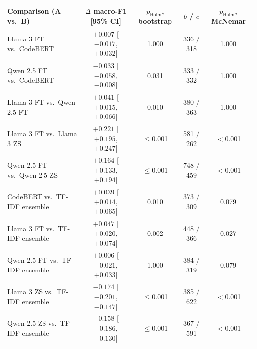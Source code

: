 \begin{tabular*}{\tblwidth}{@{\extracolsep{\fill}} l c c c c @{}}
\toprule
Comparison (A vs.\ B) & $\Delta$ macro-F1 [95\% CI] & $p_{\text{Holm}}$, bootstrap & $b$ / $c$ & $p_{\text{Holm}}$, McNemar \\
\midrule
Llama 3 FT vs.\ CodeBERT & $+0.007$ [$-0.017$, $+0.032$] & 1.000 & 336 / 318 & 1.000 \\
Qwen 2.5 FT vs.\ CodeBERT & $-0.033$ [$-0.058$, $-0.008$] & 0.031 & 333 / 332 & 1.000 \\
Llama 3 FT vs.\ Qwen 2.5 FT & $+0.041$ [$+0.015$, $+0.066$] & 0.010 & 380 / 363 & 1.000 \\
Llama 3 FT vs.\ Llama 3 ZS & $+0.221$ [$+0.195$, $+0.247$] & $\le$0.001 & 581 / 262 & $<$0.001 \\
Qwen 2.5 FT vs.\ Qwen 2.5 ZS & $+0.164$ [$+0.133$, $+0.194$] & $\le$0.001 & 748 / 459 & $<$0.001 \\
CodeBERT vs.\ TF-IDF ensemble & $+0.039$ [$+0.014$, $+0.065$] & 0.010 & 373 / 309 & 0.079 \\
Llama 3 FT vs.\ TF-IDF ensemble & $+0.047$ [$+0.020$, $+0.074$] & 0.002 & 448 / 366 & 0.027 \\
Qwen 2.5 FT vs.\ TF-IDF ensemble & $+0.006$ [$-0.021$, $+0.033$] & 1.000 & 384 / 319 & 0.079 \\
Llama 3 ZS vs.\ TF-IDF ensemble & $-0.174$ [$-0.201$, $-0.147$] & $\le$0.001 & 385 / 622 & $<$0.001 \\
Qwen 2.5 ZS vs.\ TF-IDF ensemble & $-0.158$ [$-0.186$, $-0.130$] & $\le$0.001 & 367 / 591 & $<$0.001 \\
\bottomrule
\end{tabular*}
